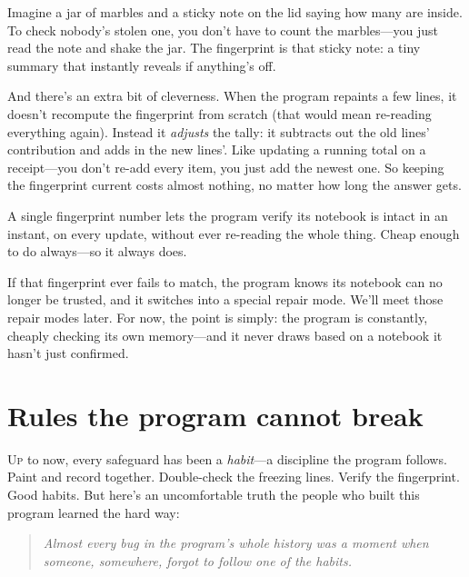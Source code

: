 \documentclass[11pt,twoside]{book}
\begin{document}
\begin{pic}
Imagine a jar of marbles and a sticky note on the lid saying how many are
inside. To check nobody's stolen one, you don't have to count the marbles---you
just read the note and shake the jar. The fingerprint is that sticky note: a
tiny summary that instantly reveals if anything's off.
\end{pic}

And there's an extra bit of cleverness. When the program repaints a few lines,
it doesn't recompute the fingerprint from scratch (that would mean re-reading
everything again). Instead it \emph{adjusts} the tally: it subtracts out the
old lines' contribution and adds in the new lines'. Like updating a running
total on a receipt---you don't re-add every item, you just add the newest one.
So keeping the fingerprint current costs almost nothing, no matter how long
the answer gets.

\begin{insight}
A single fingerprint number lets the program verify its notebook is intact in
an instant, on every update, without ever re-reading the whole thing. Cheap
enough to do always---so it always does.
\end{insight}

If that fingerprint ever fails to match, the program knows its notebook can no
longer be trusted, and it switches into a special repair mode. We'll meet those
repair modes later. For now, the point is simply: the program is constantly,
cheaply checking its own memory---and it never draws based on a notebook it
hasn't just confirmed.

\chapter{Rules the program cannot break}
\lettrine{U}{p} to now, every safeguard has been a \emph{habit}---a discipline
the program follows. Paint and record together. Double-check the freezing
lines. Verify the fingerprint. Good habits. But here's an uncomfortable truth
the people who built this program learned the hard way:

\begin{quote}
\itshape Almost every bug in the program's whole history was a moment when
someone, somewhere, \emph{forgot} to follow one of the habits.
\end{quote}
\end{document}
